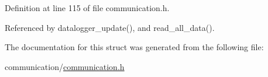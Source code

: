 Definition at line 115 of file communication.\-h.



Referenced by datalogger\-\_\-update(), and read\-\_\-all\-\_\-data().



The documentation for this struct was generated from the following file\-:\begin{DoxyCompactItemize}
\item 
communication/\hyperlink{communication_8h}{communication.\-h}\end{DoxyCompactItemize}

